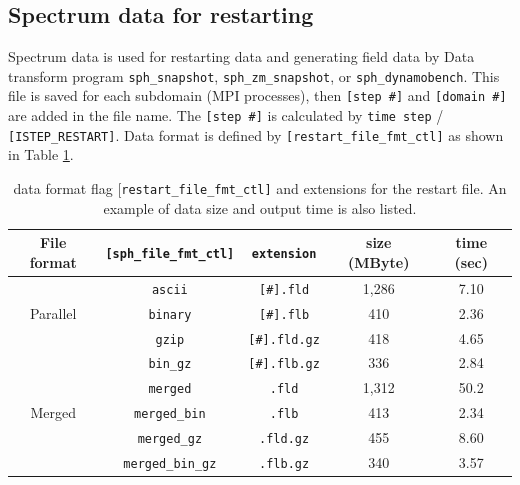 \subsection{Spectrum data for restarting}
Spectrum data is used for restarting data and generating field data by Data transform program \verb|sph_snapshot|, \verb|sph_zm_snapshot|, or \verb|sph_dynamobench|. This file is saved for each subdomain (MPI processes), then \verb|[step #]| and \verb|[domain #]| are added in the file name. The \verb|[step #]| is calculated by \verb|time step| / \verb|[ISTEP_RESTART]|. Data format is defined by \verb|[restart_file_fmt_ctl]| as shown in Table \ref{table:restart_format}.
%
\begin{table}[htp]
\caption{data format flag {[\tt restart\_file\_fmt\_ctl]} and extensions for the restart file. An example of data size and output time is also listed.}
\begin{center} 
\begin{tabular}{|c|c|c|c|c|}
\hline
File format & \verb|[sph_file_fmt_ctl]|  & \verb|extension| & size (MByte) & time (sec)  \\ \hline \hline
              &  \verb|ascii| & \verb|[#].fld|  & 1,286 & 7.10 \\
Parallel  &  \verb|binary| & \verb|[#].flb|  & 410 & 2.36 \\
              &  \verb|gzip| &  \verb|[#].fld.gz| & 418 &  4.65 \\
              &  \verb|bin_gz| &\verb|[#].flb.gz| & 336 &  2.84 \\ \hline
              & \verb|merged|  &  \verb|.fld| & 1,312 & 50.2 \\
Merged  &  \verb|merged_bin| &  \verb|.flb| & 413 &  2.34 \\
              &  \verb|merged_gz| &  \verb|.fld.gz| & 455 & 8.60 \\
              &  \verb|merged_bin_gz| &  \verb|.flb.gz| & 340 & 3.57 \\ \hline
\end{tabular}
\end{center}
\label{table:restart_format}
\end{table}
%

